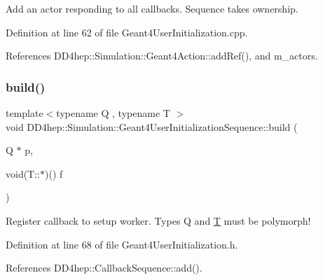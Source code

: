 Add an actor responding to all callbacks. Sequence takes ownership. 



Definition at line 62 of file Geant4\+User\+Initialization.\+cpp.



References D\+D4hep\+::\+Simulation\+::\+Geant4\+Action\+::add\+Ref(), and m\+\_\+actors.

\hypertarget{class_d_d4hep_1_1_simulation_1_1_geant4_user_initialization_sequence_a47c04fa2bb3a03bf1754a9f4c4d1eacf}{}\label{class_d_d4hep_1_1_simulation_1_1_geant4_user_initialization_sequence_a47c04fa2bb3a03bf1754a9f4c4d1eacf} 
\subsubsection{\texorpdfstring{build()}{build()}\hspace{0.1cm}{\footnotesize\ttfamily [1/2]}}
{\footnotesize\ttfamily template$<$typename Q , typename T $>$ \\
void D\+D4hep\+::\+Simulation\+::\+Geant4\+User\+Initialization\+Sequence\+::build (\begin{DoxyParamCaption}\item[{Q $\ast$}]{p,  }\item[{void(T\+::$\ast$)()}]{f }\end{DoxyParamCaption})\hspace{0.3cm}{\ttfamily [inline]}}



Register callback to setup worker. Types Q and \hyperlink{class_t}{T} must be polymorph! 



Definition at line 68 of file Geant4\+User\+Initialization.\+h.



References D\+D4hep\+::\+Callback\+Sequence\+::add().

\hypertarget{class_d_d4hep_1_1_simulation_1_1_geant4_user_initialization_sequence_a7805c4b772060132398bf2d02a83d4c2}{}\label{class_d_d4hep_1_1_simulation_1_1_geant4_user_initialization_sequence_a7805c4b772060132398bf2d02a83d4c2} 
